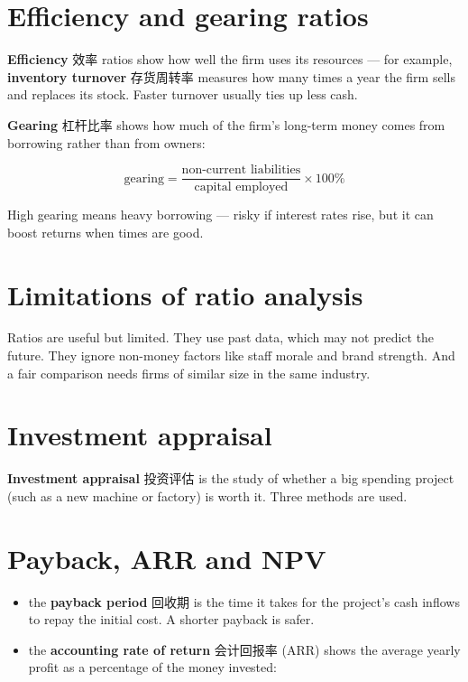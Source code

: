\documentclass[11pt]{article}
\begin{document}
\section*{Efficiency and gearing ratios}

\textbf{Efficiency} 效率 ratios show how well the firm uses its resources — for example, \textbf{inventory turnover} 存货周转率 measures how many times a year the firm sells and replaces its stock. Faster turnover usually ties up less cash.

\textbf{Gearing} 杠杆比率 shows how much of the firm's long-term money comes from borrowing rather than from owners:

\[
\text{gearing} = \frac{\text{non-current liabilities}}{\text{capital employed}} \times 100\%
\]

High gearing means heavy borrowing — risky if interest rates rise, but it can boost returns when times are good.

\section*{Limitations of ratio analysis}

Ratios are useful but limited. They use past data, which may not predict the future. They ignore non-money factors like staff morale and brand strength. And a fair comparison needs firms of similar size in the same industry.

\section*{Investment appraisal}

\textbf{Investment appraisal} 投资评估 is the study of whether a big spending project (such as a new machine or factory) is worth it. Three methods are used.

\section*{Payback, ARR and NPV}

\begin{itemize}
\item the \textbf{payback period} 回收期 is the time it takes for the project's cash inflows to repay the initial cost. A shorter payback is safer.

\item the \textbf{accounting rate of return} 会计回报率 (ARR) shows the average yearly profit as a percentage of the money invested:

\end{itemize}
\end{document}
